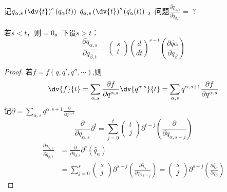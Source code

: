 \documentclass[12pt, a4paper, oneside, UTF8]{ctexbook}  %
\newcommand{\pa}{\partial}
\begin{document}
\begin{proposition}
    记\(q_{\alpha,s}\left(\dv{t}\right)^s\left(q_\alpha(t)\right)\)
    \(\tilde{q}_{\alpha,s}\left(\dv{t}\right)^s\left(\tilde{q_\alpha}(t)\right)\)
    ，问题\(
        \frac{\pa \tilde{q}_{\alpha,s}}{\pa \tilde{q}_{\beta,t}}=\;?\qquad
\)

若\(s<t\)，则\(=0\)。下设\(s>t\)：
\[
\frac{\partial\tilde{q}_{\alpha, s}}{\partial q_{\beta,t}}=
\begin{pmatrix}
s \\
t
\end{pmatrix}
\left(\frac{d}{dt}\right)^{s-t}
\left(\frac{\partial\tilde{q\alpha}}{\partial q_\beta}\right)
\]
\begin{proof}
若\(f=f(q,q',q'',\cdots)\),则
\[
\dv{f}{t}=\sum_{\alpha,s}\frac{\pa f}{\pa q^{\alpha,s}}\dv{q^{\alpha,s}}{t}
=\sum_{\alpha,s}q^{\alpha,s+1}\frac{\pa f}{\pa q^{\alpha,s}}
\]
记\(\pa =\sum_{\alpha,s}q^{\alpha,s+1}\frac{\pa }{\pa q^{\alpha,s}}\)
\[
    \frac{\partial}{\partial q_{\alpha,s}}\pa^t=
    \sum_{j=0}^{t}
    \begin{pmatrix}
    t\\
    j
    \end{pmatrix}
    \pa^{t-j}
    \left(\frac{\partial}{\partial q_{\alpha,s-j}}\right)
\]
\begin{align*}
    \frac{\pa \tilde{q}_{\alpha,s}}{\pa \tilde{q}_{\beta,t}}
    &=\frac{\pa }{\pa q_{\beta,t}}\pa ^s(\tilde{q_\alpha})\\
    &=\sum_{j=0}^{s}
    \begin{pmatrix}
    s\\
    j
    \end{pmatrix}
    \pa^{s-j}
    \left(\frac{\partial \tilde{q_\alpha}}{\partial q_{\beta,t-j}}\right)
    =\begin{pmatrix}
        s\\
        j
        \end{pmatrix}
        \pa^{s-j}
        \left(\frac{\partial \tilde{q_\alpha}}{\partial q_\beta}\right)    
\end{align*}
\end{proof}
\end{proposition}
\end{document}
